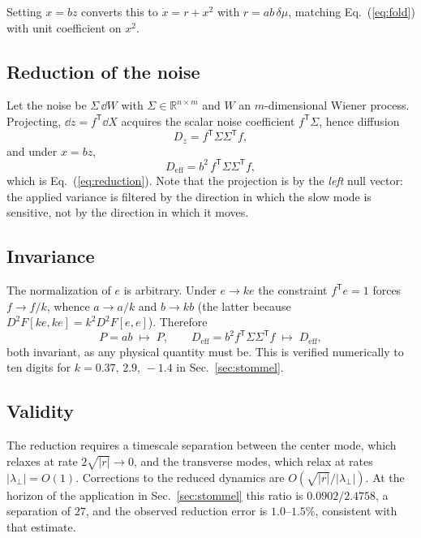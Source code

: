 Setting $x=bz$ converts this to $\dot x=r+x^2$ with $r=ab\,\delta\mu$, matching Eq.~(\ref{eq:fold}) with unit coefficient on $x^2$.

\subsection{Reduction of the noise}

Let the noise be $\Sigma\,\dd W$ with $\Sigma\in\mathbb{R}^{n\times m}$ and $W$ an $m$-dimensional Wiener process.  Projecting, $\dd z=f^{\mathsf T}\dd X$ acquires the scalar noise coefficient $f^{\mathsf T}\Sigma$, hence diffusion
\begin{equation}
D_z=f^{\mathsf T}\Sigma\Sigma^{\mathsf T}f ,
\end{equation}
and under $x=bz$,
\begin{equation}
D_{\mathrm{eff}}=b^2\,f^{\mathsf T}\Sigma\Sigma^{\mathsf T}f ,
\end{equation}
which is Eq.~(\ref{eq:reduction}).  Note that the projection is by the \emph{left} null vector: the applied variance is filtered by the direction in which the slow mode is sensitive, not by the direction in which it moves.

\subsection{Invariance}

The normalization of $e$ is arbitrary.  Under $e\to ke$ the constraint $f^{\mathsf T}e=1$ forces $f\to f/k$, whence $a\to a/k$ and $b\to kb$ (the latter because $D^2F[ke,ke]=k^2D^2F[e,e]$).  Therefore
\begin{equation}
P=ab\;\mapsto\;P,
\qquad
D_{\mathrm{eff}}=b^2f^{\mathsf T}\Sigma\Sigma^{\mathsf T}f\;\mapsto\;D_{\mathrm{eff}},
\end{equation}
both invariant, as any physical quantity must be.  This is verified numerically to ten digits for $k=0.37,\,2.9,\,-1.4$ in Sec.~\ref{sec:stommel}.

\subsection{Validity}

The reduction requires a timescale separation between the center mode, which relaxes at rate $2\sqrt{|r|}\to0$, and the transverse modes, which relax at rates $|\lambda_\perp|=O(1)$.  Corrections to the reduced dynamics are $O(\sqrt{|r|}/|\lambda_\perp|)$.  At the horizon of the application in Sec.~\ref{sec:stommel} this ratio is $0.0902/2.4758$, a separation of $27$, and the observed reduction error is $1.0$--$1.5\%$, consistent with that estimate.

